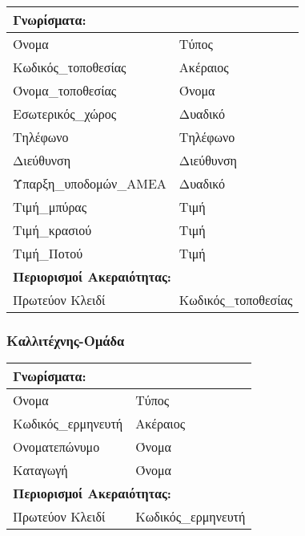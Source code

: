 \begin{tabular}{|p{6cm}|p{8cm}|}
  \multicolumn{2}{l}{\textbf{Γνωρίσματα:}}               \\ \hline
  Όνομα                  & Τύπος                         \\ \hline
  Κωδικός\_τοποθεσίας    & Ακέραιος                      \\ \hline
  Όνομα\_τοποθεσίας      & Όνομα                         \\ \hline
  Εσωτερικός\_χώρος      & Δυαδικό                       \\ \hline
  Τηλέφωνο               & Τηλέφωνο                      \\ \hline
  Διεύθυνση              & Διεύθυνση                     \\ \hline
  Ύπαρξη\_υποδομών\_ΑΜΕΑ & Δυαδικό                       \\ \hline
  Τιμή\_μπύρας           & Τιμή                          \\ \hline
  Τιμή\_κρασιού          & Τιμή                          \\ \hline
  Τιμή\_Ποτού            & Τιμή                          \\ \hline
  \multicolumn{2}{l}{\textbf{Περιορισμοί Ακεραιότητας:}} \\ \hline
  Πρωτεύον Κλειδί        & Κωδικός\_τοποθεσίας           \\ \hline
\end{tabular}


\subsubsection{Καλλιτέχνης-Ομάδα}

\begin{tabular}{|p{6cm}|p{8cm}|}
  \multicolumn{2}{l}{\textbf{Γνωρίσματα:}}               \\ \hline
  Όνομα              & Τύπος                             \\ \hline
  Κωδικός\_ερμηνευτή & Ακέραιος                          \\ \hline
  Ονοματεπώνυμο      & Όνομα                             \\ \hline
  Καταγωγή           & Όνομα                             \\ \hline
  \multicolumn{2}{l}{\textbf{Περιορισμοί Ακεραιότητας:}} \\ \hline
  Πρωτεύον Κλειδί    & Κωδικός\_ερμηνευτή                \\ \hline
\end{tabular}

